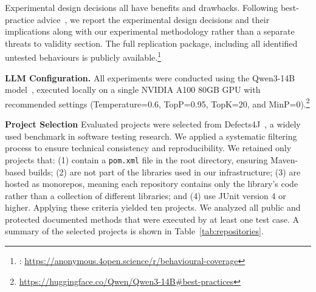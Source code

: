 Experimental design decisions all have benefits and drawbacks. Following best-practice advice~\cite{design-tradeoffs}, we report the experimental design decisions and their implications along with our experimental methodology rather than a separate threats to validity section. 
The full replication package, including all identified untested behaviours is publicly available.\footnote{\toolname{}: \url{https://anonymous.4open.science/r/behavioural-coverage}}

\smallskip
\noindent\textbf{LLM Configuration.} All experiments were conducted using the Qwen3-14B model~\cite{qwen3technicalreport}, executed locally on a single NVIDIA A100 80GB GPU with recommended settings (Temperature=0.6, TopP=0.95, TopK=20, and MinP=0).\footnote{\url{https://huggingface.co/Qwen/Qwen3-14B\#best-practices}}

\smallskip
\noindent\textbf{Project Selection}
Evaluated projects were selected from 
Defects4J~\cite{10.1145/2610384.2628055}, a widely used benchmark in software testing research. 
We applied a systematic filtering process to ensure technical consistency and reproducibility. 
We retained only projects that: (1) contain a \texttt{pom.xml} file in the root directory, ensuring Maven-based builds; (2) are not part of the libraries used in our \toolname{} infrastructure; (3) are hosted as monorepos, meaning each repository contains only the library's code rather than a collection of different libraries; and (4) use JUnit version 4 or higher. Applying these criteria yielded ten projects. 
We analyzed all public and protected documented methods that were executed by at least one test case.
A summary of the selected projects is shown in Table~\ref{tab:repositories}.

